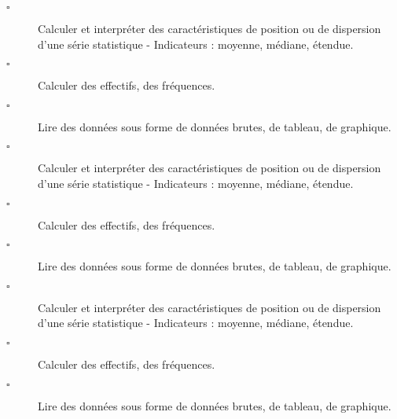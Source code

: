 \documentclass[openany]{book}
\begin{document}
\begin{seance}[Statistiques]

\begin{description}
\item[$\square$]  Calculer et interpréter des caractéristiques de position ou de dispersion d’une série statistique - Indicateurs : moyenne, médiane, étendue.
\item[$\square$] Calculer des effectifs, des fréquences.
\item[$\square$] Lire des données sous forme de données brutes, de tableau, de graphique.
\end{description}
\end{seance}


\Exe



\Exe



\Exe




\begin{seance}[Statistiques]

\begin{description}
\item[$\square$]  Calculer et interpréter des caractéristiques de position ou de dispersion d’une série statistique - Indicateurs : moyenne, médiane, étendue.
\item[$\square$] Calculer des effectifs, des fréquences.
\item[$\square$] Lire des données sous forme de données brutes, de tableau, de graphique.
\end{description}
\end{seance}

\Exe




\Exe



\Exe

 





\begin{seance}[Statistiques]

\begin{description}
\item[$\square$]  Calculer et interpréter des caractéristiques de position ou de dispersion d’une série statistique - Indicateurs : moyenne, médiane, étendue.
\item[$\square$] Calculer des effectifs, des fréquences.
\item[$\square$] Lire des données sous forme de données brutes, de tableau, de graphique.
\end{description}
\end{seance}
\end{document}
